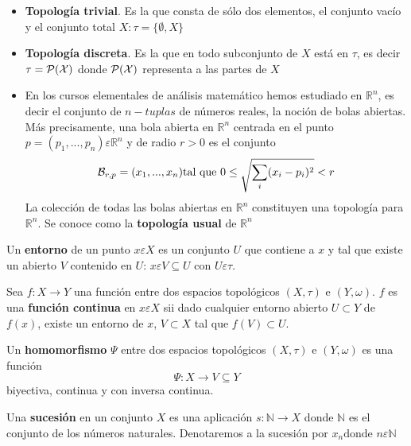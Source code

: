 \begin{itemize}
\item {\bf Topolog\'ia trivial}. Es la que consta de s\'olo dos elementos, el conjunto vac\'io y el conjunto total $X: \tau=\{\emptyset,X \}$
    
\item {\bf Topolog\'ia discreta}. Es la que en todo subconjunto de $X$ est\'a en $\tau$, es decir $\tau = \cal{P}(X)$ donde $\cal{P}(X)$ representa a las partes de $X$
    
\item En los cursos elementales de an\'alisis matem\'atico hemos estudiado en $\mathbb{R}^n$, es decir el conjunto de $n-tuplas$ de n\'umeros reales, la noci\'on de bolas abiertas. M\'as precisamente, una bola abierta en $\mathbb{R}^n$ centrada en el punto $p =(p_1,...,p_n) \varepsilon \mathbb{R}^n$ y de radio $r>0$ es el conjunto
    \[
{\cal{B}}_{r,p}={(x_1,...,x_n) \text{tal que   } 0\leq \sqrt{\sum_i (x_i-p_i)^2}<r}
\]
La colecci\'on de todas las bolas abiertas en $\mathbb{R}^n$ constituyen una topolog\'ia para $\mathbb{R}^n$. Se conoce como la {\bf topolog\'ia usual} de $\mathbb{R}^n$

\end{itemize}

\begin{definicion}
Un {\bf entorno} de un punto $x \varepsilon X$ es un conjunto $U$ que contiene a $x$ y tal que existe un abierto $V$ contenido en $U$: $x \varepsilon V \subseteq U$ con $U \varepsilon \tau$.
\end{definicion}

\begin{definicion}
Sea $f: X \rightarrow Y$ una funci\'on entre dos espacios topol\'ogicos $(X, \tau)$ e $(Y,\omega)$. $f$ es una {\bf funci\'on continua} en $x \varepsilon X$ sii dado cualquier entorno abierto $U \subset Y$ de $f(x)$, existe un entorno de $x$, $V \subset X$ tal que $f(V) \subset U$.
\end{definicion}

\begin{definicion}
Un {\bf homomorfismo} $\Psi$ entre dos espacios topol\'ogicos $(X,\tau)$ e $(Y,\omega)$ es una funci\'on
\[
\Psi: X \rightarrow V \subseteq Y
\]
biyectiva, continua y con inversa continua.
\end{definicion}

\begin{definicion}
Una {\bf sucesi\'on} en un conjunto $X$ es una aplicaci\'on $s: \mathbb{N} \rightarrow X$ donde $\mathbb{N}$ es el conjunto de los n\'umeros naturales. Denotaremos a la sucesi\'on por ${x_n} \text{donde  } n \varepsilon \mathbb{N}$
\end{definicion}

